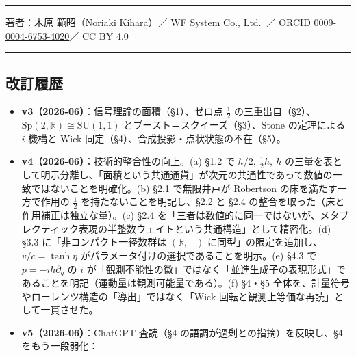 \documentclass[
]{ltjsarticle}
\providecommand{\tightlist}{%
  \setlength{\itemsep}{0pt}\setlength{\parskip}{0pt}}
\begin{document}
\begin{center}\rule{0.5\linewidth}{0.5pt}\end{center}

著者：木原 範昭（Noriaki Kihara）／ WF System Co., Ltd.~／ ORCID
\href{https://orcid.org/0009-0004-6753-4020}{0009-0004-6753-4020}／ CC
BY 4.0

\begin{center}\rule{0.5\linewidth}{0.5pt}\end{center}

\subsection{改訂履歴}\label{ux6539ux8a02ux5c65ux6b74}

\begin{itemize}
\tightlist
\item
  \textbf{v3（2026-06）}：信号理論の面積（§1）、ゼロ点 \(\tfrac12\)
  の三重出自（§2）、\(\mathrm{Sp}(2,\mathbb{R})\cong\mathrm{SU}(1,1)\)
  とブースト＝スクイーズ（§3）、Stone の定理による \(i\) 機構と Wick
  同定（§4）、合成投影・点状状態の不在（§5）。
\item
  \textbf{v4（2026-06）}：技術的整合性の向上。(a) §1.2 で
  \(\hbar/2,\ \tfrac12 h,\ h\)
  の三量を表として明示分離し、「面積という共通通貨」が次元の共通性であって数値の一致ではないことを明確化。(b)
  §2.1 で無限井戸が Robertson の床を満たす一方で作用の \(\tfrac12\)
  を持たないことを明記し、§2.2 と §2.4
  の整合を取った（床と作用補正は独立な量）。(c) §2.4
  を「三者は数値的に同一ではないが、メタプレクティック表現の半整数ウェイトという共通構造」として精密化。(d)
  §3.3 に「非コンパクト一径数群は \((\mathbb{R},+)\)
  に同型」の限定を追加し、\(v/c=\tanh\eta\)
  がパラメータ付けの選択であることを明示。(e) §4.3 で
  \(p=-i\hbar\partial_q\) の \(i\)
  が「観測不能性の徴」ではなく「並進生成子の表現形式」であることを明記（運動量は観測可能量である）。(f)
  §4・§5 全体を、計量符号やローレンツ構造の「導出」ではなく「Wick
  回転と観測上等価な再読」として一貫させた。
\item
  \textbf{v5（2026-06）}：ChatGPT 査読（§4
  の語調が過剰との指摘）を反映し、§4 をもう一段弱化：


\end{itemize}
\end{document}
